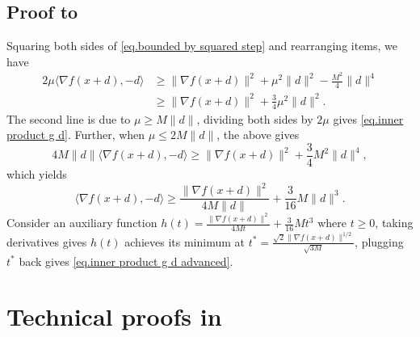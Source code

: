 \documentclass[moor,sglanonrev]{informs4}
\begin{document}
\begin{APPENDICES}
    \subsection*{Proof to~}
    Squaring both sides of \eqref{eq.bounded by squared step} and rearranging items, we have
    \begin{equation*}
        \begin{aligned}
            2\mu \langle \nabla f(x+d),-d \rangle & \geq \|\nabla f(x+d)\|^2 +\mu^2 \|d\|^2 -\frac{M^2}{4}\|d\|^4 \\
                                                  & \geq \|\nabla f(x+d)\|^2 +\frac{3}{4}\mu^2 \|d\|^2.
        \end{aligned}
    \end{equation*}
    The second line is due to $\mu\geq M\|d\|$, dividing both sides by $2\mu$ gives \eqref{eq.inner product g d}. Further, when $\mu \leq 2M\|d\|$, the above gives
    \begin{equation*}
        4M\|d\| \langle \nabla f(x+d),-d \rangle \geq \|\nabla f(x+d)\|^2 +\frac{3}{4} M^2 \|d\|^4,
    \end{equation*}
    which yields
    \begin{equation*}
        \langle \nabla f(x+d),-d \rangle \geq \frac{\|\nabla f(x+d)\|^2}{4M\|d\|}+\frac{3}{16}M\|d\|^3.
    \end{equation*}
    Consider an auxiliary function $h(t) = \frac{\|\nabla f(x+d)\|^2}{4Mt}+\frac{3}{16}Mt^3$ where $t\geq 0$, taking derivatives gives $h(t)$ achieves its minimum at $t^*= \frac{\sqrt{2}\|\nabla f(x+d)\|^{1/2}}{\sqrt{3M}}$, plugging $t^*$ back gives \eqref{eq.inner product g d advanced}.
    \Halmos \endproof
    \section{Technical proofs in~}\label{sec.proof variant 1}

\end{APPENDICES}
\end{document}
